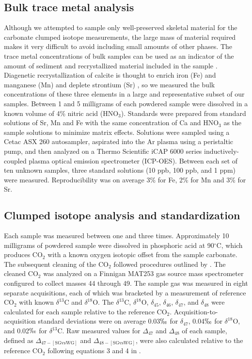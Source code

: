 \documentclass[5p, authoryear]{elsarticle}
\newcommand{\deltao}{$\delta^{18}$}
\newcommand{\deltac}{$\delta^{13}$}
\newcommand{\degrees}{$^{\circ}$}
\begin{document}
\subsection{Bulk trace metal analysis}

Although we attempted to sample only well-preserved skeletal material for the carbonate clumped isotope measurements, the large mass of material required makes it very difficult to avoid including small amounts of other phases. The trace metal concentrations of bulk samples can be used as an indicator of the amount of sediment and recrystallized material included in the sample \citep{Azmy1998,Brand2012,Came2007,Finnegan2011}. Diagenetic recrystallization of calcite is thought to enrich iron (Fe) and manganese (Mn) and deplete strontium (Sr) \citep{Brand1980,Shields2003}, so we measured the bulk concentrations of these three elements in a large and representative subset of our samples. Between 1 and 5 milligrams of each powdered sample were dissolved in a known volume of 4\% nitric acid (HNO$_3$). Standards were prepared from standard solutions of Sr, Mn and Fe with the same concentration of Ca and HNO$_3$ as the sample solutions to minimize matrix effects. Solutions were sampled using a Cetac ASX 260 autosampler, aspirated into the Ar plasma using a peristaltic pump, and then analyzed on a Thermo Scientific iCAP 6000 series inductively-coupled plasma optical emission spectrometer (ICP-OES). Between each set of ten unknown samples, three standard solutions (10 ppb, 100 ppb, and 1 ppm) were measured. Reproducibility was on average 3\% for Fe, 2\% for Mn and 3\% for Sr. 

\subsection{Clumped isotope analysis and standardization}

Each sample was measured between one and three times. Approximately 10 milligrams of powdered sample were dissolved in phosphoric acid at 90\degrees C, which produces CO$_2$ with a known oxygen isotopic offset from the sample carbonate. The subsequent cleaning of the CO$_2$ followed procedures outlined by \cite{Ghosh2006}. The cleaned CO$_2$ was analyzed on a Finnigan MAT253 gas source mass spectrometer configured to collect masses 44 through 49. The sample gas was measured in eight separate acquisitions, each of which was bracketed by a measurement of reference CO$_2$ with known \deltac C and \deltao O. The \deltac C, \deltao O, $\delta_{45}$, $\delta_{46}$, $\delta_{47}$, and $\delta_{48}$ were calculated for each sample relative to the reference CO$_2$. Acquisition-to-acquisition standard deviations were on average 0.03$\permil$ for $\delta_{47}$, 0.04$\permil$ for \deltao O, and 0.02$\permil$ for \deltac C. Raw measured values for $\Delta_{47}$ and $\Delta_{48}$ of each sample, defined as $\Delta_{47-[\text{SGvsWG}]}$ and $\Delta_{48-[\text{SGvsWG}]}$, were also calculated relative to the reference CO$_2$ following equations 3 and 4 in \cite{Huntington2009}.
\end{document}
